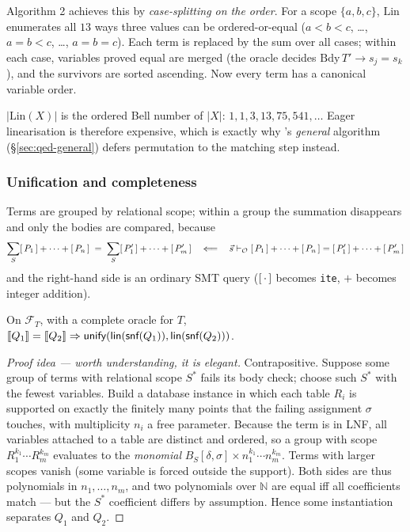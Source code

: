 Algorithm 2 achieves this by \emph{case-splitting on the order}. For a scope
$\{a,b,c\}$, $\mathrm{Lin}$ enumerates all $13$ ways three values can be ordered-or-equal
($a{<}b{<}c$, \dots, $a{=}b{<}c$, \dots, $a{=}b{=}c$). Each term is replaced by the sum over
all cases; within each case, variables proved equal are merged (the oracle decides
$\mathrm{Bdy}\,T'\to s_j=s_k$), and the survivors are sorted ascending. Now every term has a
canonical variable order.

\begin{remark}[cost]
$|\mathrm{Lin}(X)|$ is the ordered Bell number of $|X|$: $1, 1, 3, 13, 75, 541,\dots$
Eager linearisation is therefore expensive, which is exactly why \QED{}'s \emph{general}
algorithm (\S\ref{sec:qed-general}) defers permutation to the matching step instead.
\end{remark}

\subsubsection{Unification and completeness}
Terms are grouped by relational scope; within a group the summation disappears and only the
bodies are compared, because
\[
\sum_{S}[\,P_1\,]+\cdots+[\,P_n\,] \;=\; \sum_{S}[\,P'_1\,]+\cdots+[\,P'_m\,]
\quad\Longleftarrow\quad
\vec s \vdash_{\mathcal O} [\,P_1\,]+\cdots+[\,P_n\,] = [\,P'_1\,]+\cdots+[\,P'_m\,]
\]
and the right-hand side is an ordinary SMT query ($[\,\cdot\,]$ becomes \texttt{ite},
$+$ becomes integer addition).

\begin{theorem}
On $\mathcal F_T$, with a complete oracle for $T$,
$[\![ Q_1 ]\!]=[\![ Q_2 ]\!]\Rightarrow \textsf{unify}(\textsf{lin}(\textsf{snf}(Q_1)),\textsf{lin}(\textsf{snf}(Q_2)))$.
\end{theorem}
\begin{proof}[Proof idea --- worth understanding, it is elegant]
Contrapositive. Suppose some group of terms with relational scope $S^*$ fails its body
check; choose such $S^*$ with the fewest variables. Build a database instance in which each
table $R_i$ is supported on exactly the finitely many points that the failing assignment
$\sigma$ touches, with multiplicity $n_i$ a free parameter. Because the term is in LNF, all
variables attached to a table are distinct and ordered, so a group with scope
$R_1^{k_1}\cdots R_m^{k_m}$ evaluates to the \emph{monomial}
$B_S[\delta,\sigma]\times n_1^{k_1}\cdots n_m^{k_m}$. Terms with larger scopes vanish (some
variable is forced outside the support). Both sides are thus polynomials in
$n_1,\dots,n_m$, and two polynomials over $\mathbb{N}$ are equal iff all coefficients match
--- but the $S^*$ coefficient differs by assumption. Hence some instantiation separates
$Q_1$ and $Q_2$.
\end{proof}

